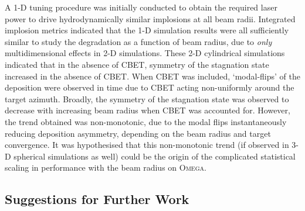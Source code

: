 A 1-D tuning procedure was initially conducted to obtain the required laser power to drive hydrodynamically similar implosions at all beam radii.
Integrated implosion metrics indicated that the 1-D simulation results were all sufficiently similar to study the degradation as a function of beam radius, due to \textit{only} multidimensional effects in 2-D simulations.
These 2-D cylindrical simulations indicated that in the absence of \ac{CBET}, symmetry of the stagnation state increased in the absence of \ac{CBET}.
When \ac{CBET} was included, `modal-flips' of the deposition were observed in time due to \ac{CBET} acting non-uniformly around the target azimuth.
Broadly, the symmetry of the stagnation state was observed to decrease with increasing beam radius when \ac{CBET} was accounted for.
However, the trend obtained was non-monotonic, due to the modal flips instantaneously reducing deposition asymmetry, depending on the beam radius and target convergence.
It was hypothesised that this non-monotonic trend (if observed in 3-D spherical simulations as well) could be the origin of the complicated statistical scaling in performance with the beam radius on \textsc{Omega}.

\subsection{Suggestions for Further Work}

